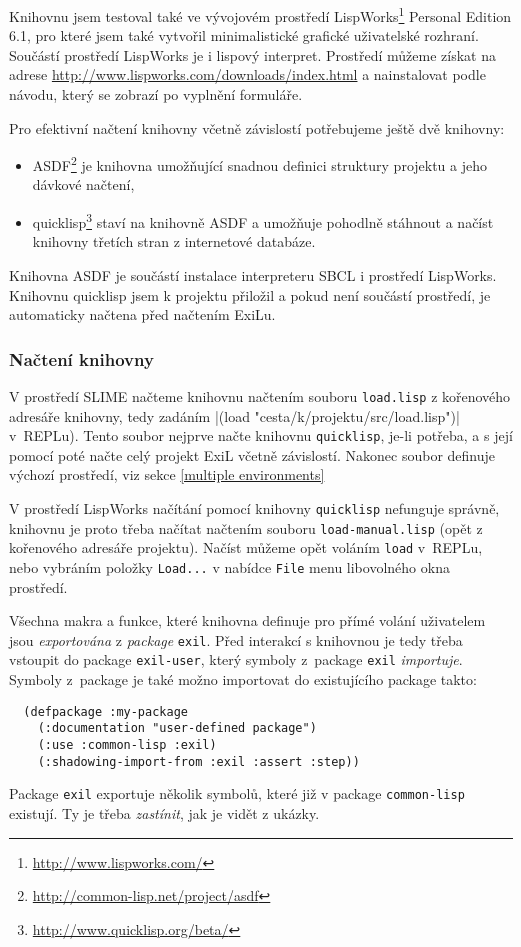Knihovnu jsem testoval také ve vývojovém prostředí
LispWorks\registered\footnote{\url{http://www.lispworks.com/}} Personal Edition
6.1, pro které jsem také vytvořil minimalistické grafické uživatelské rozhraní.
Součástí prostředí LispWorks je i lispový interpret. Prostředí můžeme získat na
adrese \url{http://www.lispworks.com/downloads/index.html} a nainstalovat podle
návodu, který se zobrazí po vyplnění formuláře.

Pro efektivní načtení knihovny včetně závislostí potřebujeme ještě dvě knihovny:
\clearpage
\begin{itemize}
  \item ASDF\footnote{\url{http://common-lisp.net/project/asdf}} je knihovna
    umožňující snadnou definici struktury projektu a jeho dávkové načtení,
  \item quicklisp\footnote{\url{http://www.quicklisp.org/beta/}} staví na knihovně
    ASDF a umožňuje pohodlně stáhnout a načíst knihovny třetích stran z internetové
    databáze.
\end{itemize}
Knihovna ASDF je součástí instalace interpreteru SBCL i prostředí LispWorks.
Knihovnu quicklisp jsem k projektu přiložil a pokud není součástí prostředí, je
automaticky načtena před načtením ExiLu.
\subsubsection{Načtení knihovny}
V prostředí SLIME načteme knihovnu načtením souboru \verb|load.lisp| z kořenového
adresáře knihovny, tedy zadáním \cl|(load "cesta/k/projektu/src/load.lisp")|
v~REPLu). Tento soubor nejprve načte knihovnu \verb|quicklisp|, je-li potřeba,
a s její pomocí poté načte celý projekt ExiL včetně závislostí. Nakonec soubor
definuje výchozí prostředí, viz sekce \ref{multiple environments}

V prostředí LispWorks načítání pomocí knihovny \verb|quicklisp| nefunguje správně,
knihovnu je proto třeba načítat načtením souboru \verb|load-manual.lisp| (opět
z kořenového adresáře projektu). Načíst můžeme opět voláním \verb|load| v~REPLu,
nebo vybráním položky \verb|Load...| v nabídce \verb|File| menu libovolného okna
prostředí.

Všechna makra a funkce, které knihovna definuje pro přímé volání uživatelem jsou
\emph{exportována} z \emph{package} \verb|exil|. Před interakcí s knihovnou je
tedy třeba vstoupit do package \verb|exil-user|, který symboly z~package
\verb|exil| \emph{importuje}. Symboly z~package je také možno importovat do
existujícího package takto:
\begin{verbatim}
  (defpackage :my-package
    (:documentation "user-defined package")
    (:use :common-lisp :exil)
    (:shadowing-import-from :exil :assert :step))
\end{verbatim}
Package \verb|exil| exportuje několik symbolů, které již v package
\verb|common-lisp| existují. Ty je třeba \emph{zastínit}, jak je vidět z ukázky.
